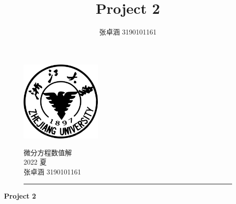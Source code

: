 \documentclass[a4paper,11.5pt,UTF8]{ctexart}
\title{Project 2}
\author{张卓涵 3190101161}
\begin{document}
\begin{figure}[t]
\begin{minipage}[h]{0.25\linewidth}
	\includegraphics[width=4.0cm]{./figure/ZJU2.jpeg}
\end{minipage}
\hfill
\begin{minipage}[h]{.7\linewidth}
	\begin{flushright}
			\Large{微分方程数值解
				\vspace{3mm}	\\
				   2022 夏
				\vspace{3mm}	\\
				   张卓涵 \hspace{3mm}3190101161}
	\end{flushright}
\end{minipage}
\rule{\linewidth}{0.1em}
\end{figure}
\begin{center}
	\huge{\textbf{Project 2}}
\end{center}
\end{document}

